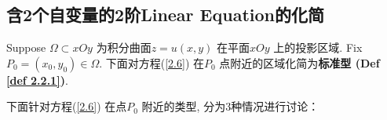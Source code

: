 \newpage

\subsection{含2个自变量的2阶Linear Equation的化简}
	Suppose $\Omega \subset xOy$ 为积分曲面$z = u(x , y)$ 在平面$xOy$ 上的投影区域. Fix $P_0 = (x_0 , y_0) \in \Omega$. 下面对方程(\ref{2.6}) 在$P_0$ 点附近的区域化简为\textbf{标准型 (Def \ref{def 2.2.1})}. 
	
	\vspace*{2em}
	
	\hspace*{-1.85em}下面针对方程(\ref{2.6}) 在点$P_0$ 附近的类型, 分为3种情况进行讨论：
	
	\vspace*{1em}
	
